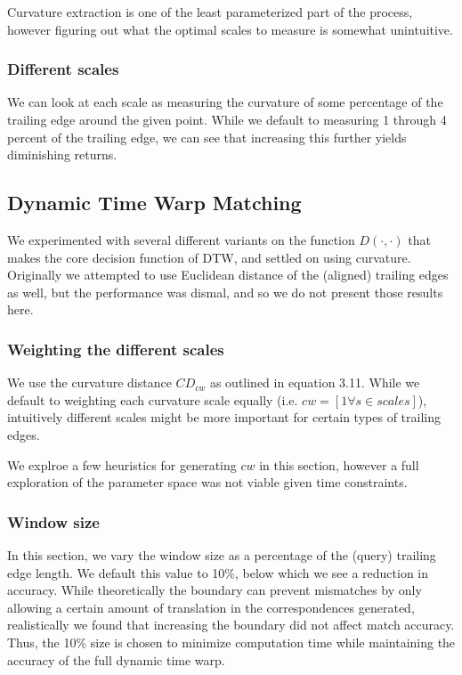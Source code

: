 Curvature extraction is one of the least parameterized part of the process, however figuring out what the optimal scales to measure is somewhat unintuitive.

\subsubsection{Different scales}

We can look at each scale as measuring the curvature of some percentage of the trailing edge around the given point.
While we default to measuring 1 through 4 percent of the trailing edge, we can see that increasing this further yields diminishing returns. %

\subsection{Dynamic Time Warp Matching}

We experimented with several different variants on the function $D(\cdot,\cdot)$ that makes the core decision function of DTW, and settled on using curvature.
Originally we attempted to use Euclidean distance of the (aligned) trailing edges as well, but the performance was dismal, and so we do not present those results here.

\subsubsection{Weighting the different scales}

We use the curvature distance $CD_{cw}$ as outlined in equation 3.11.
While we default to weighting each curvature scale equally (i.e. $cw = [1 \forall s \in scales]$), intuitively different scales might be more important for certain types of trailing edges.

We explroe a few heuristics for generating $cw$ in this section, however a full exploration of the parameter space was not viable given time constraints.


\subsubsection{Window size}

In this section, we vary the window size as a percentage of the (query) trailing edge length.
We default this value to 10\%, below which we see a reduction in accuracy.
While theoretically the boundary can prevent mismatches by only allowing a certain amount of translation in the correspondences generated, realistically we found that increasing the boundary did not affect match accuracy.
Thus, the 10\% size is chosen to minimize computation time while maintaining the accuracy of the full dynamic time warp.

